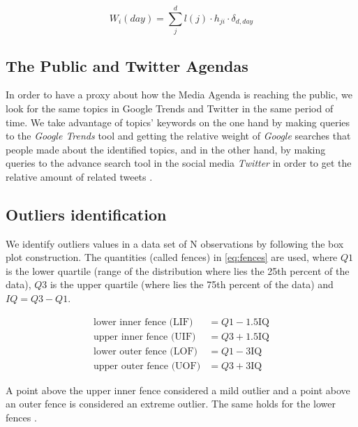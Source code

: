 \documentclass[a4paper, 12pt]{article}
\begin{document}
\begin{equation}
W_i(day) = \sum_j^d l(j) \cdot h_{ji} \cdot \delta_{d,day}
\label{eq:topic_weight}
\end{equation}


\subsection{The Public and Twitter Agendas}
 
\par In order to have a proxy about how the Media Agenda is reaching the public, we look for the same topics in Google Trends and Twitter in the same period of time. We take advantage of topics' keywords on the one hand by making queries to the \emph{Google Trends} tool and getting the relative weight of \emph{Google} searches that people made about the identified topics, and in the other hand, by making queries to the advance search tool in the social media \emph{Twitter} in order to get the relative amount of related tweets . 


\subsection{Outliers identification}
\label{sec:outliers_identification}

\par We identify outliers values in a data set of N observations by following the box plot construction. The quantities (called fences) in \ref{eq:fences} are used, where $Q1$ is the lower quartile (range of the distribution where lies the 25th percent of the data), $Q3$ is the upper quartile (where lies the 75th percent of the data) and $IQ = Q3 - Q1$.

\begin{equation}
\begin{split}
\text{lower inner fence (LIF)} & = Q1 - 1.5  \text{IQ} \\
\text{upper inner fence (UIF)} & = Q3 + 1.5  \text{IQ} \\
\text{lower outer fence (LOF)} & = Q1 - 3  \text{IQ} \\
\text{upper outer fence (UOF)} & = Q3 + 3  \text{IQ}
\end{split}
\label{eq:fences}
\end{equation}

\par A point above the upper inner fence considered a mild outlier and a point above an outer fence is considered an extreme outlier. The same holds for the lower fences \cite{natrella2010nist}. 
\end{document}

